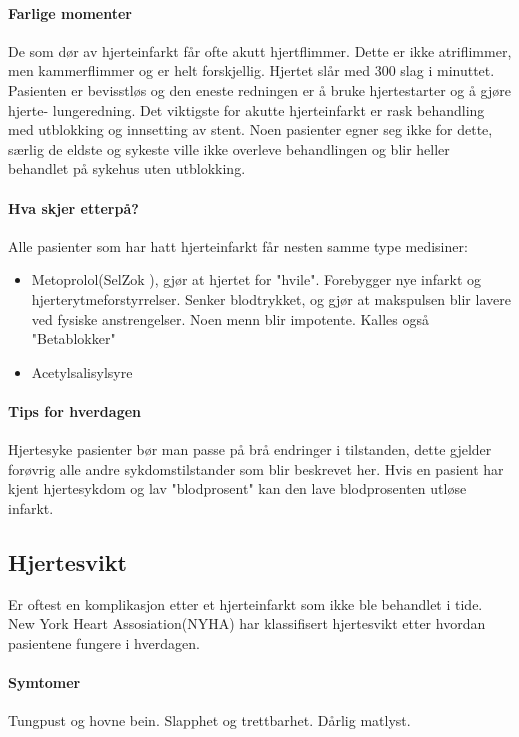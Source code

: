 				\paragraph{Farlige momenter\\}
					De som dør av hjerteinfarkt får ofte akutt hjertflimmer. Dette er ikke atriflimmer, men kammerflimmer og er helt forskjellig. Hjertet slår med 300 slag i minuttet. Pasienten er bevisstløs og den eneste redningen er å bruke hjertestarter og å gjøre hjerte- lungeredning. Det viktigste for akutte hjerteinfarkt er rask behandling med utblokking og innsetting av stent. Noen pasienter egner seg ikke for dette, særlig de eldste og sykeste ville ikke overleve behandlingen og blir heller behandlet på sykehus uten utblokking. 
				\paragraph{Hva skjer etterpå?\\}
					Alle pasienter som har hatt hjerteinfarkt får nesten samme type medisiner:
					\begin{itemize}
						\item Metoprolol(SelZok \textregistered), gjør at hjertet for "hvile". Forebygger nye infarkt og hjerterytmeforstyrrelser. Senker blodtrykket, og gjør at makspulsen blir lavere ved fysiske anstrengelser. Noen menn blir impotente. Kalles også "Betablokker"\\
						\item Acetylsalisylsyre\\%
					\end{itemize}
				\paragraph{Tips for hverdagen\\}
					Hjertesyke pasienter bør man passe på brå endringer i tilstanden, dette gjelder forøvrig alle andre sykdomstilstander som blir beskrevet her. Hvis en pasient har kjent hjertesykdom og lav "blodprosent" kan den lave blodprosenten utløse infarkt.
			\subsection{Hjertesvikt}
				Er oftest en komplikasjon etter et hjerteinfarkt som ikke ble behandlet i tide. New York Heart Assosiation(NYHA) har klassifisert hjertesvikt etter hvordan pasientene fungere i hverdagen. 
				\paragraph{Symtomer\\}
					Tungpust og hovne bein. Slapphet og trettbarhet. Dårlig matlyst.
